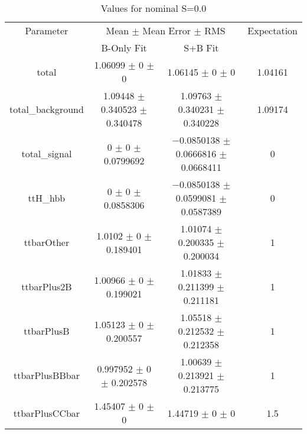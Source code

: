 \begin{table}
\centering
\caption{Values for nominal S=0.0}
\begin{tabular}{cccc}
\toprule
Parameter & \multicolumn{2}{c}{Mean $\pm$ Mean Error $\pm$ RMS} & Expectation\\
 & B-Only Fit & S+B Fit & \\
\midrule
total & \num{1.06099} $\pm$ \num{0} $\pm$ \num{0} & \num{1.06145} $\pm$ \num{0} $\pm$ \num{0} & \num{1.04161}\\
total\_background & \num{1.09448} $\pm$ \num{0.340523} $\pm$ \num{0.340478} & \num{1.09763} $\pm$ \num{0.340231} $\pm$ \num{0.340228} & \num{1.09174}\\
total\_signal & \num{0} $\pm$ \num{0} $\pm$ \num{0.0799692} & \num{-0.0850138} $\pm$ \num{0.0666816} $\pm$ \num{0.0668411} & \num{0}\\
ttH\_hbb & \num{0} $\pm$ \num{0} $\pm$ \num{0.0858306} & \num{-0.0850138} $\pm$ \num{0.0599081} $\pm$ \num{0.0587389} & \num{0}\\
ttbarOther & \num{1.0102} $\pm$ \num{0} $\pm$ \num{0.189401} & \num{1.01074} $\pm$ \num{0.200335} $\pm$ \num{0.200034} & \num{1}\\
ttbarPlus2B & \num{1.00966} $\pm$ \num{0} $\pm$ \num{0.199021} & \num{1.01833} $\pm$ \num{0.211399} $\pm$ \num{0.211181} & \num{1}\\
ttbarPlusB & \num{1.05123} $\pm$ \num{0} $\pm$ \num{0.200557} & \num{1.05518} $\pm$ \num{0.212532} $\pm$ \num{0.212358} & \num{1}\\
ttbarPlusBBbar & \num{0.997952} $\pm$ \num{0} $\pm$ \num{0.202578} & \num{1.00639} $\pm$ \num{0.213921} $\pm$ \num{0.213775} & \num{1}\\
ttbarPlusCCbar & \num{1.45407} $\pm$ \num{0} $\pm$ \num{0} & \num{1.44719} $\pm$ \num{0} $\pm$ \num{0} & \num{1.5}\\
\bottomrule
\end{tabular}
\end{table}
